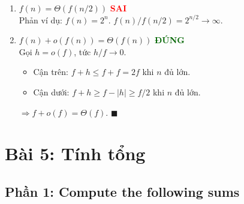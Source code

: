 \documentclass[12pt,a4paper]{article}
\begin{document}
\begin{enumerate}[label=\textbf{\alph*.}]
  \bigskip

  \item $f(n) = \Theta(f(n/2))$ \hfill \textcolor{red}{\textbf{SAI}} \\[4pt]
  Phản ví dụ: $f(n) = 2^n$. $f(n)/f(n/2) = 2^{n/2} \to \infty$.

  \bigskip

  \item $f(n) + o(f(n)) = \Theta(f(n))$ \hfill \textcolor{darkgreen}{\textbf{ĐÚNG}} \\[4pt]
  Gọi $h = o(f)$, tức $h/f \to 0$.
  \begin{itemize}[noitemsep]
    \item Cận trên: $f + h \leq f + f = 2f$ khi $n$ đủ lớn.
    \item Cận dưới: $f + h \geq f - |h| \geq f/2$ khi $n$ đủ lớn.
  \end{itemize}
  $\Longrightarrow f + o(f) = \Theta(f)$. \hfill $\blacksquare$

\end{enumerate}

\newpage
\section{Bài 5: Tính tổng}

\subsection{Phần 1: Compute the following sums}
\end{document}
